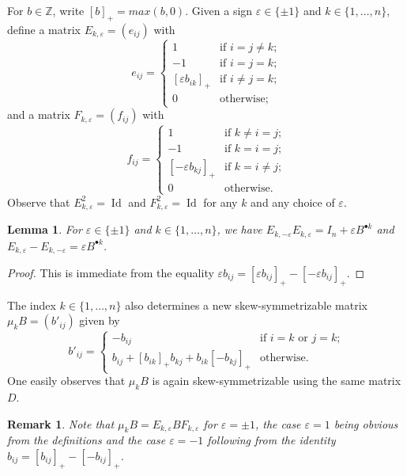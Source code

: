 \documentclass{amsart}
\newtheorem{lemma}[theorem]{Lemma}
\newtheorem{remark}[theorem]{Remark}
\numberwithin{theorem}{section}
\newcommand{\ZZ}{\mathbb{Z}}
\newcommand{\Id}{\operatorname{Id}}
\begin{document}
  For $b\in\ZZ$, write $[b]_+=max(b,0)$.
  Given a sign $\varepsilon\in\{\pm1\}$ and $k\in\{1,\ldots,n\}$, define a matrix $E_{k,\varepsilon}=(e_{ij})$ with
  \begin{equation}
    \label{eq:left mutation matrix}
    e_{ij}=\begin{cases} 1 & \text{if $i=j\ne k$;}\\ -1 & \text{if $i=j=k$;}\\ [\varepsilon b_{ik}]_+ & \text{if $i\ne j=k$;}\\ 0 & \text{otherwise;} \end{cases}
  \end{equation}
  and a matrix $F_{k,\varepsilon}=(f_{ij})$ with
  \begin{equation}
    \label{eq:right mutation matrix}
    f_{ij}=\begin{cases} 1 & \text{if $k\ne i=j$;}\\ -1 & \text{if $k=i=j$;}\\ [-\varepsilon b_{kj}]_+ & \text{if $k=i\ne j$;}\\ 0 & \text{otherwise.} \end{cases}
  \end{equation}
  Observe that $E^2_{k,\varepsilon}=\Id$ and $F^2_{k,\varepsilon}=\Id$ for any $k$ and any choice of $\varepsilon$.
  \begin{lemma}
    For $\varepsilon\in\{\pm1\}$ and $k\in\{1,\ldots,n\}$, we have $E_{k,-\varepsilon}E_{k,\varepsilon}=I_n+\varepsilon B^{\bullet k}$ and $E_{k,\varepsilon}-E_{k,-\varepsilon}=\varepsilon B^{\bullet k}$.
  \end{lemma}
  \begin{proof}
    This is immediate from the equality $\varepsilon b_{ij}=[\varepsilon b_{ij}]_+-[-\varepsilon b_{ij}]_+$.
  \end{proof}

  The index $k\in\{1,\ldots,n\}$ also determines a new skew-symmetrizable matrix $\mu_k B=(b'_{ij})$ given by
  \[ b'_{ij}=\begin{cases} -b_{ij} & \text{if $i=k$ or $j=k$;}\\ b_{ij}+[b_{ik}]_+b_{kj}+b_{ik}[-b_{kj}]_+ & \text{otherwise.} \end{cases} \]
  One easily observes that $\mu_k B$ is again skew-symmetrizable using the same matrix $D$.
  \begin{remark}
    Note that $\mu_k B=E_{k,\varepsilon} B F_{k,\varepsilon}$ for $\varepsilon=\pm 1$, the case $\varepsilon=1$ being obvious from the definitions and the case $\varepsilon=-1$ following from the identity $b_{ij}=[b_{ij}]_+-[-b_{ij}]_+$.
  \end{remark}
\end{document}
